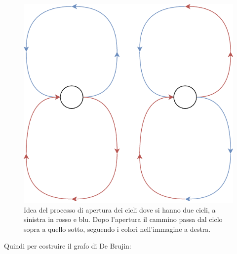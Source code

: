 \documentclass[a4paper,12pt, oneside]{book}
\begin{document}
  \begin{figure}
    \centering
    \includegraphics[scale = 0.7]{img/gra11.pdf}
    \caption{Idea del processo di apertura dei cicli dove si hanno due cicli, a
      sinistra in rosso e blu. Dopo l'apertura il cammino passa dal ciclo sopra a
      quello sotto, seguendo i colori nell'immagine a destra.}
    \label{fig:cic}
  \end{figure}
Quindi per costruire il grafo di De Brujin:
\end{document}
